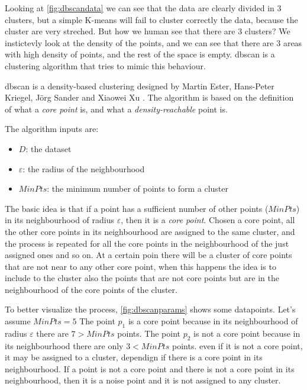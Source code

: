 Looking at \autoref{fig:dbscandata} we can see that the data are clearly divided in $3$ clusters, but a simple K-means will fail to cluster correctly the data, because the cluster are very streched. 
But how we human see that there are $3$ clusters? We instictevly look at the density of the points, and we can see that there are $3$ areas with high density of points, and the rest of the space is empty. \gls{dbscan} is a clustering algorithm that tries to mimic this behaviour.

\gls{dbscan} is a density-based clustering designed by Martin Ester, Hans-Peter Kriegel, Jörg Sander and Xiaowei Xu \cite{dbscan}. The algorithm is based on the definition of what a  \emph{core point} is, and what a \emph{density-reachable} point is.


The algorithm inputs are:
\begin{itemize}
    \item $D$: the dataset
    \item $\varepsilon$: the radius of the neighbourhood
    \item $MinPts$: the minimum number of points to form a cluster
\end{itemize}

The basic idea is that if a point has a sufficient number of other points ($MinPts$) in its neighbourhood of radius $\varepsilon$, then it is a \emph{core point}. Chosen a core point, all the other core points in its neighbourhood are assigned to the same cluster, and the process is repeated for all the core points in the neighbourhood of the just assigned ones and so on. At a certain poin there will be a cluster of core points that are not near to any other core point, when this happens the idea is to include to the cluster also the points that are not core points but are in the neighbourhood of the core points of the cluster. 

To better visualize the process, \autoref{fig:dbscanparams} shows some datapoints. Let's assume $MinPts = 5$ The point $p_1$ is a core point because in its neighbourhood of radius $\varepsilon$ there are $7>MinPts$ points. The point $p_2$ is not a core point because in its neighbourhood there are only $3<MinPts$ points. even if it is not a core point, it may be assigned to a cluster, dependign if there is a core point in its neighbourhood. If a point is not a core point and there is not a core point in its neighbourhood, then it is a noise point and it is not assigned to any cluster. 


